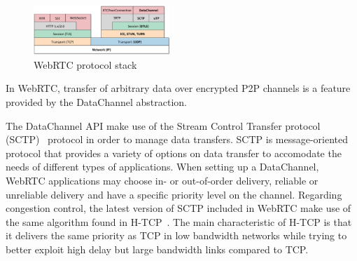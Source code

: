\documentclass{sig-alternate}
\begin{document}




\begin{figure}[t]
  \centering
    \includegraphics[width=0.46\textwidth]{figs/architecture2}
\vspace*{-0.38cm}
	\caption{WebRTC protocol stack} \label{fig:architecture}
\vspace*{-0.4cm}
\end{figure}


In WebRTC, transfer of arbitrary data over encrypted P2P channels is a feature provided by
the DataChannel abstraction. 



The DataChannel API make use of the Stream Control Transfer protocol (SCTP)~\cite{sctp}
protocol in order to manage data transfers. SCTP is message-oriented protocol that
provides a variety of options on data transfer to accomodate the needs of different types
of applications. When setting up a DataChannel, WebRTC applications may choose in- or
out-of-order delivery, reliable or unreliable delivery and have a specific priority level
on the channel. Regarding congestion control, the latest version of SCTP included in
WebRTC make use of the same algorithm found in H-TCP~\cite{htcp}. The main characteristic
of H-TCP is that it delivers the same priority as TCP in low bandwidth networks while
trying to better exploit high delay but large bandwidth links compared to TCP.
\end{document}
